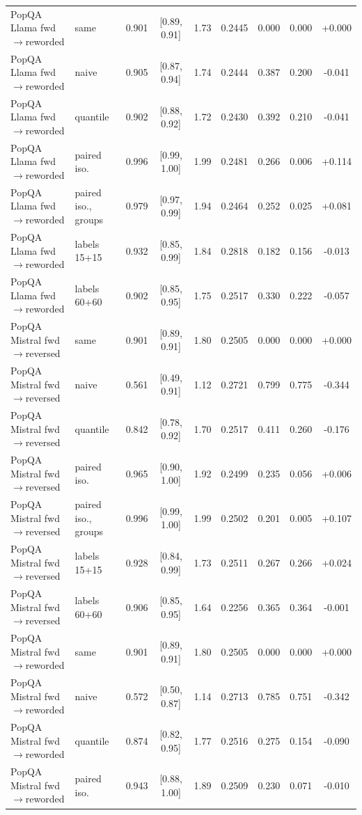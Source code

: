 \documentclass[11pt]{article}
\theoremstyle{definition}
\theoremstyle{remark}
\newcommand{\1}{\mathbf{1}}
\begin{document}
\begin{center}
\begin{tabular}{llccccccc}
\midrule
PopQA Llama fwd$\to$reworded & same & 0.901 & [0.89, 0.91] & 1.73 & 0.2445 & 0.000 & 0.000 & +0.000\\
PopQA Llama fwd$\to$reworded & naive & 0.905 & [0.87, 0.94] & 1.74 & 0.2444 & 0.387 & 0.200 & -0.041\\
PopQA Llama fwd$\to$reworded & quantile & 0.902 & [0.88, 0.92] & 1.72 & 0.2430 & 0.392 & 0.210 & -0.041\\
PopQA Llama fwd$\to$reworded & paired iso. & 0.996 & [0.99, 1.00] & 1.99 & 0.2481 & 0.266 & 0.006 & +0.114\\
PopQA Llama fwd$\to$reworded & paired iso., groups & 0.979 & [0.97, 0.99] & 1.94 & 0.2464 & 0.252 & 0.025 & +0.081\\
PopQA Llama fwd$\to$reworded & labels 15+15 & 0.932 & [0.85, 0.99] & 1.84 & 0.2818 & 0.182 & 0.156 & -0.013\\
PopQA Llama fwd$\to$reworded & labels 60+60 & 0.902 & [0.85, 0.95] & 1.75 & 0.2517 & 0.330 & 0.222 & -0.057\\
\midrule
PopQA Mistral fwd$\to$reversed & same & 0.901 & [0.89, 0.91] & 1.80 & 0.2505 & 0.000 & 0.000 & +0.000\\
PopQA Mistral fwd$\to$reversed & naive & 0.561 & [0.49, 0.91] & 1.12 & 0.2721 & 0.799 & 0.775 & -0.344\\
PopQA Mistral fwd$\to$reversed & quantile & 0.842 & [0.78, 0.92] & 1.70 & 0.2517 & 0.411 & 0.260 & -0.176\\
PopQA Mistral fwd$\to$reversed & paired iso. & 0.965 & [0.90, 1.00] & 1.92 & 0.2499 & 0.235 & 0.056 & +0.006\\
PopQA Mistral fwd$\to$reversed & paired iso., groups & 0.996 & [0.99, 1.00] & 1.99 & 0.2502 & 0.201 & 0.005 & +0.107\\
PopQA Mistral fwd$\to$reversed & labels 15+15 & 0.928 & [0.84, 0.99] & 1.73 & 0.2511 & 0.267 & 0.266 & +0.024\\
PopQA Mistral fwd$\to$reversed & labels 60+60 & 0.906 & [0.85, 0.95] & 1.64 & 0.2256 & 0.365 & 0.364 & -0.001\\
\midrule
PopQA Mistral fwd$\to$reworded & same & 0.901 & [0.89, 0.91] & 1.80 & 0.2505 & 0.000 & 0.000 & +0.000\\
PopQA Mistral fwd$\to$reworded & naive & 0.572 & [0.50, 0.87] & 1.14 & 0.2713 & 0.785 & 0.751 & -0.342\\
PopQA Mistral fwd$\to$reworded & quantile & 0.874 & [0.82, 0.95] & 1.77 & 0.2516 & 0.275 & 0.154 & -0.090\\
PopQA Mistral fwd$\to$reworded & paired iso. & 0.943 & [0.88, 1.00] & 1.89 & 0.2509 & 0.230 & 0.071 & -0.010\\

\end{tabular}
\end{center}
\end{document}
